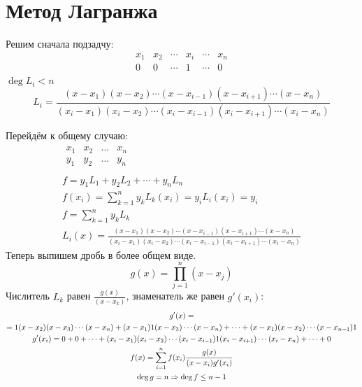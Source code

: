 ﻿\section{Метод Лагранжа}
Решим сначала подзадчу:
\[
\begin{array}{c|c|c|c|c|c}
x_1 & x_2 & \cdots & x_i & \cdots & x_n \\
\hline
0 & 0 & \cdots & 1 & \cdots & 0 \\
\end{array}
\]
$\deg L_i < n$
\[ L_i = \frac{(x - x_1)(x-x_2) \cdots (x - x_{i - 1})(x - x_{i + 1}) \cdots (x - x_n)}{(x_i - x_1)(x_i - x_2) \cdots(x_i-x_{i-1})(x_i-x_{i+1}) \cdots (x_i - x_n)} \]

Перейдём к общему случаю:
\begin{gather*}
\begin{array}{c|c|c|c}
x_1 & x_2 & \ldots & x_n \\
\hline
y_1 & y_2 & \ldots & y_n \\
\end{array} \\
f = y_1L_1 + y_2L_2 + \cdots + y_n L_n \\
f(x_i) = \sum_{k = 1}^{n} y_kL_k(x_i) = y_i L_i(x_i) = y_i \\
f = \sum_{k = 1}^{n} y_kL_k \\
L_i(x) = \frac{(x - x_1)(x - x_2) \cdots (x-x_{i-1})(x-x_{i+1}) \cdots (x - x_n)}{(x_i - x_1)(x_i - x_2) \cdots(x_i-x_{i-1})(x_i-x_{i+1}) \cdots (x_i - x_n)}
\end{gather*}
Теперь выпишем дробь в более общем виде. 
\[ g(x) = \prod_{j=1}^{n} (x-x_j) \]
Числитель $L_k$ равен $\frac{g(x)}{(x - x_k)}$, знаменатель же равен $g'(x_i)$:
\begin{gather*}
g'(x) = \\
= 1(x-x_2)(x-x_3)\cdots(x-x_n) + (x-x_1)1(x-x_3)\cdots(x-x_n) + \cdots + (x-x_1)(x-x_2)\cdots(x-x_{n-1})1 \\
g'(x_i) = 0 + 0 + \cdots + (x_i - x_1)(x_i - x_2) \cdots(x_i-x_{i-1})1(x_i-x_{i+1}) \cdots (x_i - x_n) + \cdots + 0 \\
f(x) = \sum_{i=1}^{n} f(x_i) \frac{g(x)}{(x - x_i) g'(x_i)} \\
\deg g = n \Rightarrow \deg f \le n - 1
\end{gather*}
